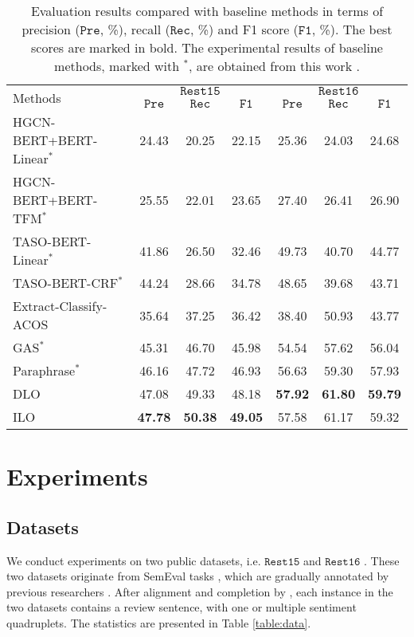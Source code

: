 \documentclass[11pt]{article}
\begin{document}
\begin{table*}[]
\small
    \centering
    \begin{tabular}{l|ccc|ccc}
    \toprule
    \multirow{2}{*}{Methods} & \multicolumn{3}{c|}{$\mathtt{Rest15}$} & \multicolumn{3}{c}{$\mathtt{Rest16}$} \\
    & $\mathtt{Pre}$ & $\mathtt{Rec}$ & $\mathtt{F1}$ & $\mathtt{Pre}$ & $\mathtt{Rec}$ & $\mathtt{F1}$ \\
    \midrule
    HGCN-BERT+BERT-Linear$^*$ \cite{cai2020aspect} & 24.43 & 20.25 & 22.15 & 25.36 & 24.03 & 24.68 \\
    HGCN-BERT+BERT-TFM$^*$ \cite{cai2020aspect} & 25.55 & 22.01 & 23.65 & 27.40 & 26.41 & 26.90 \\
    TASO-BERT-Linear$^*$ \cite{wan2020target} & 41.86 & 26.50 & 32.46 & 49.73 & 40.70 & 44.77 \\
    TASO-BERT-CRF$^*$ \cite{wan2020target} & 44.24 & 28.66 & 34.78 & 48.65 & 39.68 & 43.71 \\
    Extract-Classify-ACOS \cite{cai2021aspect} & 35.64 & 37.25 & 36.42 & 38.40 & 50.93 & 43.77 \\
    GAS$^*$ \cite{zhang-etal-2021-towards-generative} & 45.31 & 46.70 & 45.98 & 54.54 & 57.62 & 56.04 \\
    Paraphrase$^*$ \cite{zhang-etal-2021-aspect-sentiment} & 46.16 & 47.72 & 46.93 & 56.63 & 59.30 & 57.93 \\
    \midrule
DLO & 47.08 & 49.33 & 48.18 & \textbf{57.92} & \textbf{61.80} & \textbf{59.79} \\
    ILO & \textbf{47.78} & \textbf{50.38} & \textbf{49.05} & 57.58 & 61.17 & 59.32 \\
\bottomrule
    \end{tabular}
    \caption{Evaluation results compared with baseline methods in terms of precision ($\mathtt{Pre}$, \%), recall ($\mathtt{Rec}$, \%) and F1 score ($\mathtt{F1}$, \%). The best scores are marked in bold. The experimental results of baseline methods, marked with $^*$, are obtained from this work \cite{zhang-etal-2021-aspect-sentiment}.}
    \label{table:results}
\end{table*}

\section{Experiments}

\subsection{Datasets}
We conduct experiments on two public datasets, i.e. $\mathtt{Rest15}$ and $\mathtt{Rest16}$ \cite{zhang-etal-2021-aspect-sentiment}. These two datasets originate from SemEval tasks \cite{pontiki2015semeval,pontiki2016semeval}, which are gradually annotated by previous researchers \cite{peng2020knowing,wan2020target}. After alignment and completion by \citet{zhang-etal-2021-aspect-sentiment}, each instance in the two datasets contains a review sentence, with one or multiple sentiment quadruplets. The statistics are presented in Table \ref{table:data}.
\end{document}
